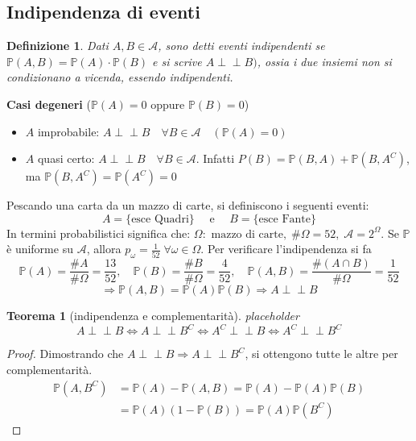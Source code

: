 \documentclass[a4paper,12pt]{article}
\theoremstyle{break}
\newtheorem{theorem}{Teorema}[section]
\newtheorem{definition}{Definizione}[section]
\newcommand{\ind}{\perp\!\!\!\!\perp}
\numberwithin{equation}{section}
\begin{document}
\subsection{Indipendenza di eventi}
\begin{definition}
  Dati \(A, B \in \mathcal{A}\), sono detti eventi indipendenti se \(\mathbb{P}(A,B) = \mathbb{P}(A) \cdot \mathbb{P}(B)\) e si scrive \(A \ind B)\), ossia i due insiemi non si condizionano a vicenda, essendo indipendenti.
\end{definition}
\textbf{Casi degeneri} (\(\mathbb{P}(A) = 0\) oppure \(\mathbb{P}(B) = 0\))
\begin{itemize}
  \item \(A\) improbabile: \(A \ind B \quad \forall B \in \mathcal{A} \quad (\mathbb{P}(A) = 0)\)
  \item \(A\) quasi certo: \(A \ind B \quad \forall B \in \mathcal{A}.\) Infatti \(P(B) = \mathbb{P}(B, A) + \mathbb{P}(B, A^C)\), ma \(\mathbb{P}(B, A^C) = \mathbb{P}(A^C) = 0\) 
\end{itemize}
Pescando una carta da un mazzo di carte, si definiscono i seguenti eventi: 
\[
  A = \{\mbox{esce Quadri}\} \quad \mbox{ e } \quad B = \{\mbox{esce Fante}\}
\]
In termini probabilistici significa che: \(\Omega: \mbox{ mazzo di carte}, \; \#\Omega = 52, \; \mathcal{A} = 2^{\Omega}\). Se \(\mathbb{P}\) è uniforme su \(\mathcal{A}\), allora \(p_{\omega} = \frac{1}{52} \; \forall \omega \in \Omega\). Per verificare l'indipendenza si fa
\[
  \mathbb{P}(A) = \frac{\#A}{\#\Omega} = \frac{13}{52}, \quad \mathbb{P}(B) = \frac{\#B}{\#\Omega} = \frac{4}{52}, \quad \mathbb{P}(A,B) = \frac{\#(A \cap B)}{\#\Omega} = \frac{1}{52} 
\]
\[
\Longrightarrow \mathbb{P}(A,B) = \mathbb{P}(A)\mathbb{P}(B) \Longrightarrow A \ind B  
\]
\begin{theorem}[indipendenza e complementarità]
placeholder
\[
    A \ind B \Longleftrightarrow A \ind B^C \Longleftrightarrow A^C \ind B \Longleftrightarrow A^C \ind B^C
\]
\end{theorem}
\begin{proof}
  Dimostrando che \(A \ind B \Longrightarrow A \ind B^C\), si ottengono tutte le altre per complementarità.
  \[
    \begin{array}{ll}
      \mathbb{P}(A, B^C)  & = \mathbb{P}(A) - \mathbb{P}(A,B) = \mathbb{P}(A) - \mathbb{P}(A)\mathbb{P}(B) \\
      & = \mathbb{P}(A)(1-\mathbb{P}(B)) = \mathbb{P}(A)\mathbb{P}(B^C) 
    \end{array}
  \]
\end{proof}
\end{document}

